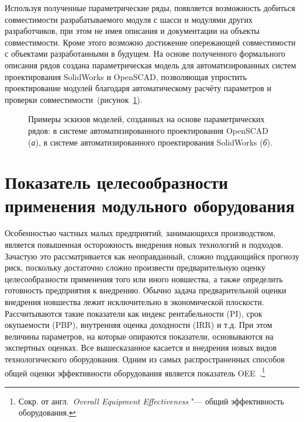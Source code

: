Используя полученные параметрические ряды, появляется возможность добиться совместимости разрабатываемого модуля с шасси и модулями других разработчиков, при этом не имея описания и документации на объекты совместимости. Кроме этого возможно достижение опережающей совместимости с объектами разработанными в будущем. На основе полученного формального описания рядов создана параметрическая модель для автоматизированных систем проектирования SolidWorks и OpenSCAD, позволяющая упростить проектирование модулей благодаря автоматическому расчёту параметров и проверки совместимости~(рисунок~\cref{fig:param}).

\begin{figure}[ht]
	\caption[Примеры эскизов моделей, созданных на основе параметрических рядов]%
	{Примеры эскизов моделей, созданных на основе параметрических рядов: в системе автоматизированного проектирования OpenSCAD (\textit{а}), в системе автоматизированного проектирования SolidWorks (\textit{б}).}\label{fig:param}
\end{figure}

\section{Показатель целесообразности применения модульного оборудования}

Особенностью частных малых предприятий, занимающихся производством, является повышенная осторожность внедрения новых технологий и подходов. Зачастую это рассматривается как неоправданный, сложно поддающийся прогнозу риск, поскольку достаточно сложно произвести предварительную оценку целесообразности применения того или иного новшества, а также определить готовность предприятия к внедрению. Обычно задача предварительной оценки внедрения новшества лежит исключительно в экономической плоскости. Рассчитываются такие показатели как индекс рентабельности (PI), срок окупаемости (PBP), внутренняя оценка доходности (IRR) и т.\:д. При этом величины параметров, на которые опираются показатели,  основываются на экспертных оценках. Все вышесказанное касается и внедрения новых видов технологического оборудования. Одним из самых распространенных способов общей оценки эффективности оборудования является показатель OEE~\cite{oee}.\footnote{Сокр. от англ.~\textit{Overall Equipment Effectiveness} "--- общий эффективность оборудования.}

